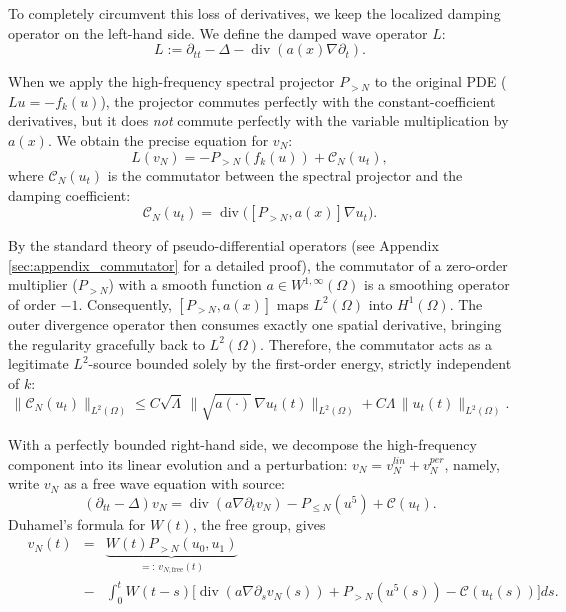 \documentclass[11pt,letterpaper]{amsart}
\newcommand{\dive}{\operatorname{div}}
\newcommand{\Om}{\Omega}
\begin{document}
To completely circumvent this loss of derivatives, we keep the localized damping operator on the left-hand side. We define the damped wave operator $L$:
\begin{equation}
    L := \partial_{tt} - \Delta - \operatorname{div}(a(x)\nabla \partial_t).
\end{equation}

When we apply the high-frequency spectral projector $P_{>N}$ to the original PDE ($L u = -f_k(u)$), the projector commutes perfectly with the constant-coefficient derivatives, but it does \textit{not} commute perfectly with the variable multiplication by $a(x)$. We obtain the precise equation for $v_N$:
\begin{equation}\label{eq:v_N_commutator}
    L(v_N) = - P_{>N}(f_k(u)) + \mathcal{C}_N(u_t),
\end{equation}
where $\mathcal{C}_N(u_t)$ is the commutator between the spectral projector and the damping coefficient:
\begin{equation}
    \mathcal{C}_N(u_t) = \operatorname{div}\Big( [P_{>N}, a(x)] \nabla u_t \Big).
\end{equation}

By the standard theory of pseudo-differential operators (see Appendix \ref{sec:appendix_commutator} for a detailed proof), the commutator of a zero-order multiplier ($P_{>N}$) with a smooth function $a \in W^{1,\infty}(\Omega)$ is a smoothing operator of order $-1$. Consequently, $[P_{>N}, a(x)]$ maps $L^2(\Omega)$ into $H^1(\Omega)$. The outer divergence operator then consumes exactly one spatial derivative, bringing the regularity gracefully back to $L^2(\Omega)$. Therefore, the commutator acts as a legitimate $L^2$-source bounded solely by the first-order energy, strictly independent of $k$:
\begin{equation}\label{eq:commutator_bound}
    \|\mathcal{C}_N(u_t)\|_{L^2(\Omega)} \le  C\sqrt{\Lambda}\,\big\|\sqrt{a(\cdot)}\,\nabla u_t(t)\big\|_{L^2(\Om)} + C\Lambda\,\|u_t(t)\|_{L^2(\Om)}.
\end{equation}

With a perfectly bounded right-hand side, we decompose the high-frequency component into its linear evolution and a perturbation: $v_N = v_N^{lin} + v_N^{per}$, namely,
write $v_N$ as a free wave equation with source:
\begin{equation}\label{eq:vN-free}
(\partial_{tt}-\Delta)v_N = \dive(a\nabla\partial_tv_N) - P_{\le N}(u^5) + \mathcal{C}(u_t).
\end{equation}
Duhamel's formula for $W(t)$, the free group, gives
\begin{eqnarray}\label{eq:duhamel}\quad
v_N(t) &=& \underbrace{W(t)P_{> N}(u_0,u_1)}_{=:\,v_{N,\mathrm{free}}(t)}
\;\\
&-&\!\int_0^t\!\! W(t-s)\Big[\dive(a\nabla\partial_sv_N(s))
+ P_{> N}(u^5(s)) - \mathcal{C}(u_t(s))\Big]ds. \nonumber
\end{eqnarray}
\end{document}
